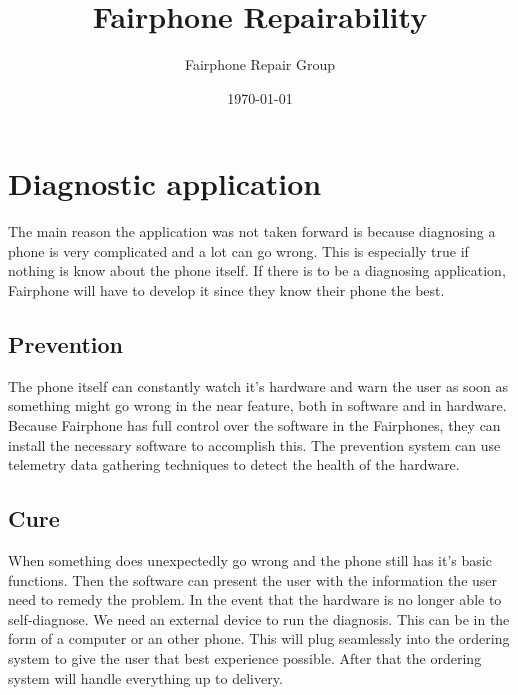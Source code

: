\documentclass[final,a4paper]{report} %
\author{Fairphone Repair Group}
\title{Fairphone Repairability}
\date{\today}
\begin{document}
	\chapter{Diagnostic application}
	\label{ch:diagnostic-application}
	The main reason the application was not taken forward is because diagnosing a phone is very complicated and a lot can go wrong. This is especially true if nothing is know about the phone itself. If there is to be a diagnosing application, Fairphone will have to develop it since they know their phone the best.
	
	\section{Prevention}
	\label{sec:diagnostic-application-prevention}
	The phone itself can constantly watch it's hardware and warn the user as soon as something might go wrong in the near feature, both in software and in hardware. Because Fairphone has full control over the software in the Fairphones, they can install the necessary software to accomplish this. The prevention system can use telemetry data gathering techniques to detect the health of the hardware.
	
	\section{Cure}
	\label{sec:diagnostic-application-cure}
	When something does unexpectedly go wrong and the phone still has it's basic functions. Then the software can present the user with the information the user need to remedy the problem. In the event that the hardware is no longer able to self-diagnose. We need an external device to run the diagnosis. This can be in the form of a computer or an other phone. This will plug seamlessly into the ordering system to give the user that best experience possible. After that the ordering system will handle everything up to delivery.
\end{document}
